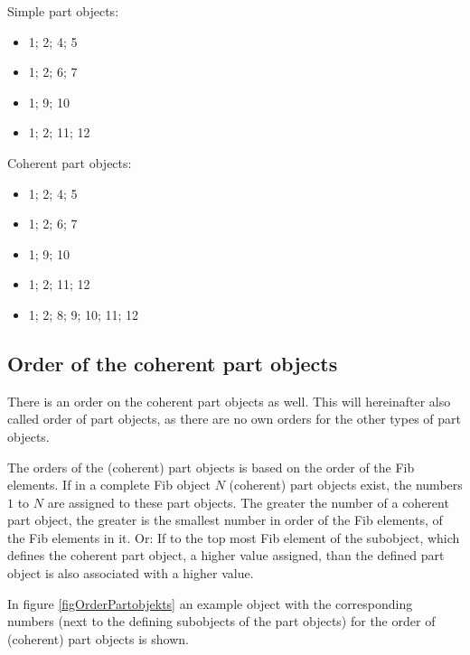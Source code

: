 Simple part objects:
\begin{itemize}
 \item 1; 2; 4; 5
 \item 1; 2; 6; 7
 \item 1; 9; 10
 \item 1; 2; 11; 12
\end{itemize}

Coherent part objects:
\begin{itemize}
 \item 1; 2; 4; 5
 \item 1; 2; 6; 7
 \item 1; 9; 10
 \item 1; 2; 11; 12
 \item 1; 2; 8; 9; 10; 11; 12
\end{itemize}


\subsection{Order of the coherent part objects}
\label{secOrderPartobjects}

There is an order on the coherent part objects as well. This will hereinafter also called order of part objects, as there are no own orders for the other types of part objects.

The orders of the (coherent) part objects is based on the order of the Fib elements. If in a complete Fib object $N$ (coherent) part objects exist, the numbers $1$ to $N$ are assigned to these part objects.
The greater the number of a coherent part object, the greater is the smallest number in order of the Fib elements, of the Fib elements in it.
Or: If to the top most Fib element of the subobject, which defines the coherent part object, a higher value assigned, than the defined part object is also associated with a higher value.

In figure \ref{figOrderPartobjekts} an example object with the corresponding numbers (next to the defining subobjects of the part objects) for the order of (coherent) part objects is shown.

